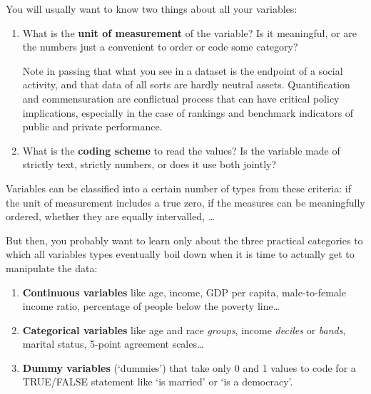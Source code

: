You will usually want to know two things about all your variables:

\begin{enumerate}
	\item What is the \textbf{unit of measurement} of the variable? Is it meaningful, or are the numbers just a convenient to order or code some category?
	
Note in passing that what you see in a dataset is the endpoint of a social activity, and that data of all sorts are hardly neutral assets. Quantification and commensuration are conflictual process that can have critical policy implications, especially in the case of rankings and benchmark indicators of public and private performance.\cite{EspelandStevens:2009n,Briatte:2012a,DavisFisher:2012x}

	\item What is the \textbf{coding scheme} to read the values? Is the variable made of strictly text, strictly numbers, or does it use both jointly?
\end{enumerate}

Variables can be classified into a certain number of types from these criteria: if the unit of measurement includes a true zero, if the measures can be meaningfully ordered, whether they are equally intervalled, …

But then, you probably want to learn only about the three practical categories to which all variables types eventually boil down when it is time to actually get to manipulate the data:

\begin{enumerate}
	\item \textbf{Continuous variables} like age, income, GDP per capita, male-to-female income ratio, percentage of people below the poverty line…
	\item \textbf{Categorical variables} like age and race \emph{groups}, income \emph{deciles} or \emph{bands}, marital status, 5-point agreement scales…
	\item \textbf{Dummy variables} (`dummies') that take only 0 and 1 values to code for a TRUE/FALSE statement like `is married' or `is a democracy'.
\end{enumerate}

